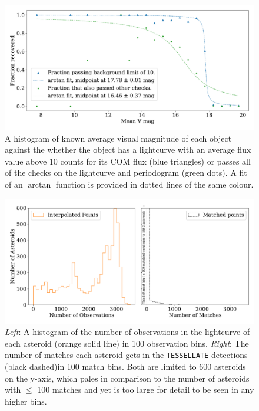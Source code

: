 \documentclass{UCreport}
\begin{document}
\begin{figure}
  \centering
  \includegraphics[width=\textwidth]{../OzData/recoverdHistBkgLimof10AtanBothLegendFixed.pdf}
  \caption[Recovery plot]{A histogram of known average visual magnitude of each object against the whether the object has a lightcurve with an average flux value above 10 %
  counts for its COM flux (blue triangles) or passes all of the checks on the lightcurve and periodogram (green dots).
  A fit of an $\arctan$ function is provided in dotted lines of the same colour. 
  }
  \label{Fig:RecovPassorFail}
\end{figure}




\begin{figure} %
  \centering
  \includegraphics[width=\textwidth]{../OzData/pointsMatchesNumberHistdouble1.pdf}
  \caption[Number of observations or matches]{\textit{Left}: A histogram of the number of observations in the lightcurve of each asteroid (orange solid line) in 100 observation bins. \textit{Right}: The number of matches each asteroid gets in the \texttt{TESSELLATE} detections (black dashed)in 100 match bins.
  Both are limited to 600 asteroids on the y-axis, which pales in comparison to the number of asteroids with $\leq$ 100 matches and yet is too large for detail to be seen in any higher bins. }
  \label{Fig:MatchInterpHists}
\end{figure}
\end{document}
